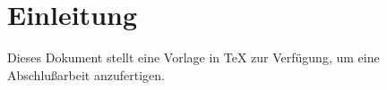 \chapter{Einleitung}

Dieses Dokument stellt eine Vorlage in TeX zur Verfügung, um eine Abschlußarbeit anzufertigen.
